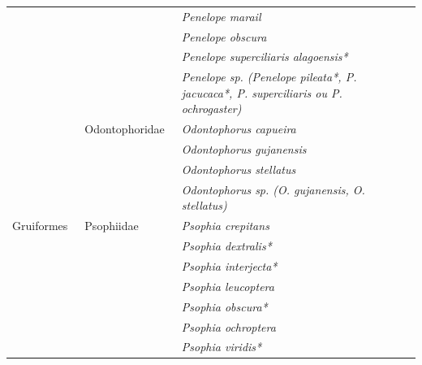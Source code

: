 \documentclass[
  letterpaper,
]{scrbook}
\begin{document}
\begin{longtable}[t]{ll>{}l}
 &  & \em{Penelope marail }\\
 &  & \em{Penelope obscura }\\
\addlinespace
 &  & \em{Penelope superciliaris alagoensis* }\\
 &  & \em{Penelope sp. (Penelope pileata*, P. jacucaca*, P. superciliaris ou P. ochrogaster) }\\
 & Odontophoridae  & \em{Odontophorus capueira }\\
 &  & \em{Odontophorus gujanensis }\\
 &  & \em{Odontophorus stellatus }\\
\addlinespace
 &  & \em{Odontophorus sp. (O. gujanensis, O. stellatus) }\\
Gruiformes  & Psophiidae  & \em{Psophia crepitans }\\
 &  & \em{Psophia dextralis* }\\
 &  & \em{Psophia interjecta* }\\
 &  & \em{Psophia leucoptera }\\
\addlinespace
 &  & \em{Psophia obscura* }\\
 &  & \em{Psophia ochroptera }\\
 &  & \em{Psophia viridis* }\\*

\end{longtable}


\backmatter
\end{document}
